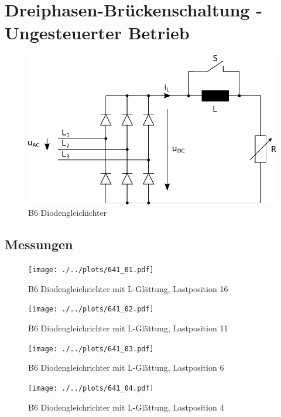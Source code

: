 \section{Dreiphasen-Brückenschaltung - Ungesteuerter Betrieb}

\begin{figure}[h!]
    \centering
    \includegraphics[scale=\sscale]{./../fig/b6_diode.pdf}
    \caption{B6 Diodengleichichter}
    \label{fig:b6_diode}
\end{figure}

\subsection{Messungen}

\begin{figure}[h!]
    \centering
    \texttt{[image: ./../plots/641\_01.pdf]}
    \caption{B6 Diodengleichrichter mit L-Glättung, Lastposition 16}
\end{figure}

\begin{figure}[h!]
    \centering
    \texttt{[image: ./../plots/641\_02.pdf]}
    \caption{B6 Diodengleichrichter mit L-Glättung, Lastposition 11}
\end{figure}

\begin{figure}[h!]
    \centering
    \texttt{[image: ./../plots/641\_03.pdf]}
    \caption{B6 Diodengleichrichter mit L-Glättung, Lastposition 6}
\end{figure}

\begin{figure}[h!]
    \centering
    \texttt{[image: ./../plots/641\_04.pdf]}
    \caption{B6 Diodengleichrichter mit L-Glättung, Lastposition 4}
\end{figure}

\clearpage

